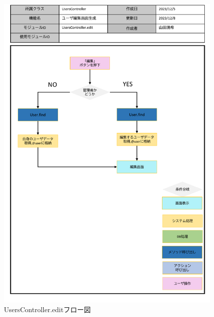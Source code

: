 \begin{figure}
	\centering
	\includegraphics[scale=0.6]{img/Users/pptx/UsersController_edit.pdf}
	\caption{UsersController.editフロー図}
\end{figure}

\clearpage


